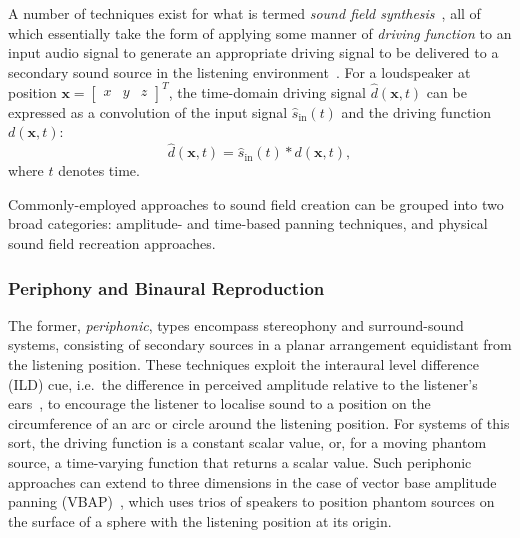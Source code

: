 \documentclass[utf8]{FrontiersinHarvard}
\newcommand{\sigin}{\hat{s}_{\text{in}}}
\begin{document}
    A number of techniques exist for what is termed \textit{sound field
    synthesis}~\citep{ahrens_analytic_2012,nicol_sound_2017}, all of which
    essentially take the form of applying some manner of \textit{driving function}
    to an input audio signal to generate an appropriate driving signal to be
    delivered to a secondary sound source in the listening
    environment~\citep{ahrens_analytic_2012}.
    For a loudspeaker at position $\mathbf{x} = \begin{bmatrix}
                                                    x & y & z
    \end{bmatrix}^T$, the time-domain driving signal $\hat{d}(\mathbf{x},t)$
    can be expressed as a convolution of the input signal $\sigin(t)$ and the
    driving function $d(\mathbf{x},t)$:
    \begin{equation}
        \label{eq:driving-signal-time}
        \hat{d}(\mathbf{x},t) = \sigin(t) \ast d(\mathbf{x},t),
    \end{equation}
    where $t$ denotes time.

    Commonly-employed approaches to sound field creation can be grouped into two
    broad categories: amplitude- and time-based panning techniques, and physical
    sound field recreation approaches.

    \subsubsection{Periphony and Binaural Reproduction}\label{subsubsec:periphony}

    The former, \textit{periphonic}, types encompass stereophony and surround-sound
    systems, consisting of secondary sources in a planar arrangement equidistant
    from the listening position.
    These techniques exploit the interaural level difference (ILD) cue, i.e.\ the
    difference in perceived amplitude relative to the listener's
    ears~\citep{pulkki_virtual_1997,verheijen_sound_1998,ziemer_wave_2020}, to
    encourage the listener to localise sound to a position on the circumference of
    an arc or circle around the listening position.
    For systems of this sort, the driving function is a constant scalar value, or,
    for a moving phantom source, a time-varying function that returns a scalar
    value.
    Such periphonic approaches can extend to three dimensions in the case of
    vector base amplitude panning (VBAP)~\citep{pulkki_virtual_1997}, which uses
    trios of speakers to position phantom sources on the surface of a sphere
    with the listening position at its origin.
\end{document}
